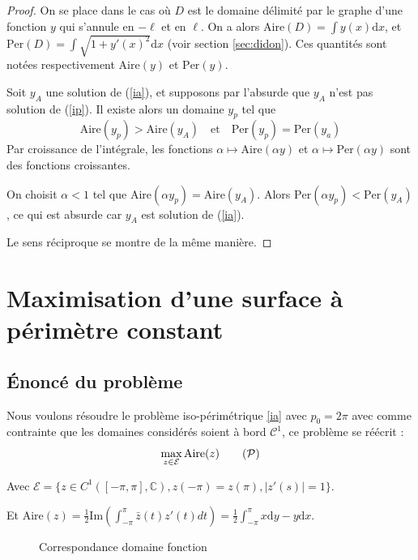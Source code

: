 \documentclass[10pt,a4paper]{article}
\newcommand{\C}{\mathcal{C}}
\renewcommand{\d}{\mathrm{d}}
\renewcommand{\P}{\mathcal{P}}
\newcommand{\A}{\mathrm{Aire}}
\newcommand{\p}{\mathrm{Per}}
\renewcommand{\Im}{\mathrm{Im}}
\theoremstyle{plain}
\theoremstyle{definition}
\begin{document}
\begin{proof}
On se place dans le cas où $D$ est le domaine délimité par le graphe d'une fonction $y$ qui s'annule en $-\ell$ et en $\ell$. On a alors $\A(D)=\int y(x)\d x$, et $\p(D)=\int\sqrt{1+y'(x)^2}\d x$ (voir section \ref{sec:didon}). Ces quantités sont notées respectivement $\A(y)$ et $\p(y)$.

Soit $y_A$ une solution de (\ref{ia}), et supposons par l'absurde que $y_A$ n'est pas solution de (\ref{ip}). Il existe alors un domaine $y_p$ tel que \[\A(y_p)>\A(y_A)\quad\text{et}\quad \p(y_p)=\p(y_a)\]
Par croissance de l'intégrale, les fonctions $\alpha\mapsto\A(\alpha y)$ et $\alpha\mapsto\p(\alpha y)$ sont des fonctions croissantes.

On choisit $\alpha<1$ tel que $\A(\alpha y_p)=\A(y_A)$. Alors $\p(\alpha y_p)<\p(y_A)$, ce qui est absurde car $y_A$ est solution de (\ref{ia}).

Le sens réciproque se montre de la même manière.
\end{proof}






\section{Maximisation d'une surface à périmètre constant}

\subsection{Énoncé du problème}

Nous voulons résoudre le problème iso-périmétrique \ref{ia} avec $p_0=2\pi$ avec comme contrainte que les domaines considérés soient à bord $\C^1$, ce problème se réécrit :
\[\max_{z \in \mathcal{E}} \A(z) \label{eq:p}\tag{$\P$}\]


Avec $\mathcal{E} = \{ z \in C^1([-\pi,\pi], \mathbb{C}), z(-\pi)=z(\pi), |z'(s)|=1 \}$.

Et $\A(z) = \frac{1}{2} \Im\left(\int_{-\pi}^{\pi}{\bar z(t) z'(t) dt}\right) = \frac{1}{2} \int_{-\pi}^{\pi}{x\d y-y\d x}$.

\begin{figure}
    \begin{center}
    \end{center}
    \caption{Correspondance domaine fonction}
    \label{fig:dom}
\end{figure}
\end{document}
